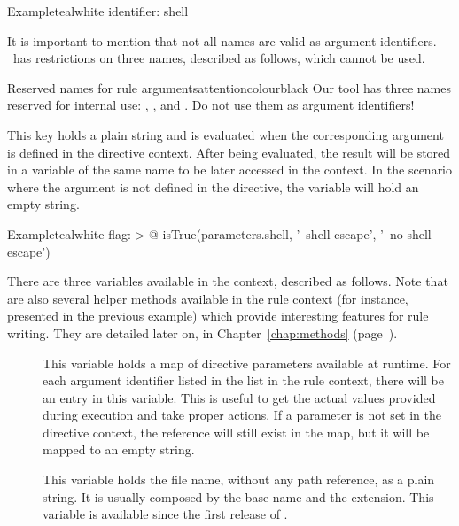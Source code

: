 \begin{description}
\begin{description}
\begin{codebox}{Example}{teal}{\icnote}{white}
identifier: shell
\end{codebox}

It is important to mention that not all names are valid as argument identifiers. \arara\ has restrictions on three names, described as follows, which cannot be used.

\begin{messagebox}{Reserved names for rule arguments}{attentioncolour}{\icattention}{black}
Our tool has three names reserved for internal use: , , and . Do not use them as argument identifiers!
\end{messagebox}

\item[\describecontext{O}{arguments}{flag}] This key holds a plain string and is evaluated when the corresponding argument is defined in the directive context.  After being evaluated, the result will be stored in a variable of the same name to be later accessed in the  context. In the scenario where the argument is not defined in the directive, the variable will hold an empty string.

\begin{codebox}{Example}{teal}{\icnote}{white}
flag: >
  @{
      isTrue(parameters.shell, '--shell-escape',
             '--no-shell-escape')
  }
\end{codebox}

There are three variables available in the  context, described as follows. Note that are also several helper methods available in the rule context (for instance,  presented in the previous example) which provide interesting features for rule writing. They are detailed later on, in Chapter~\ref{chap:methods} (page~\pageref{chap:methods}).

\begin{description}
\item[] This variable holds a map of directive parameters available at runtime. For each argument identifier listed in the  list in the rule context, there will be an entry in this variable. This is useful to get the actual values provided during execution and take proper actions. If a parameter is not set in the directive context, the reference will still exist in the map, but it will be mapped to an empty string.

\item[] This variable holds the file name, without any path reference, as a plain string. It is usually composed by the base name and the extension. This variable is available since the first release of \arara.


\end{description}
\end{description}
\end{description}
